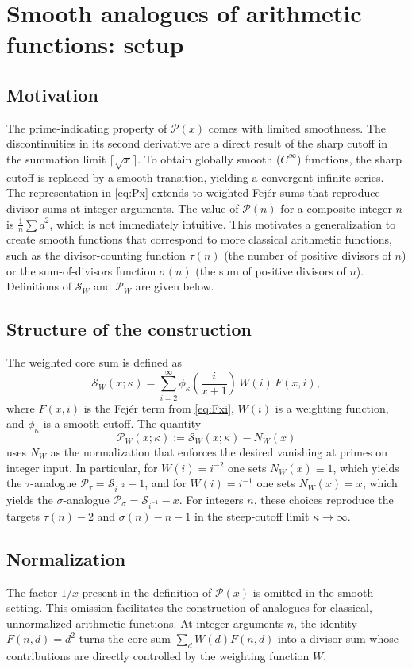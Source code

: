 \section{Smooth analogues of arithmetic functions: setup}

\subsection{Motivation}
The prime-indicating property of $\mathcal{P}(x)$ comes with limited smoothness.
The discontinuities in its second derivative are a direct result of the sharp cutoff in the summation limit $\lceil\sqrt{x}\rceil$.
To obtain globally smooth ($C^\infty$) functions, the sharp cutoff is replaced by a smooth transition, yielding a convergent infinite series.
The representation in \eqref{eq:Px} extends to weighted Fejér sums that reproduce divisor sums at integer arguments.
The value of $\mathcal{P}(n)$ for a composite integer $n$ is $\frac{1}{n}\sum d^2$, which is not immediately intuitive.
This motivates a generalization to create smooth functions that correspond to more classical arithmetic functions, such as the divisor-counting function $\tau(n)$ (the number of positive divisors of $n$) or the sum-of-divisors function $\sigma(n)$ (the sum of positive divisors of $n$).
Definitions of $\mathcal{S}_W$ and $\mathcal{P}_W$ are given below.

\subsection{Structure of the construction}
The weighted core sum is defined as
\[ \mathcal{S}_W(x; \kappa) = \sum_{i=2}^{\infty} \phi_{\kappa}\!\left(\frac{i}{x+1}\right) \, W(i) \, F(x,i), \]
where $F(x,i)$ is the Fejér term from \eqref{eq:Fxi}, $W(i)$ is a weighting function, and $\phi_{\kappa}$ is a smooth cutoff. The quantity
\[ \mathcal{P}_W(x; \kappa) := \mathcal{S}_W(x; \kappa) - N_W(x) \]
uses $N_W$ as the normalization that enforces the desired vanishing at primes on integer input. In particular, for $W(i)=i^{-2}$ one sets $N_W(x)\equiv 1$, which yields the $\tau$-analogue $\mathcal P_\tau=\mathcal S_{i^{-2}}-1$, and for $W(i)=i^{-1}$ one sets $N_W(x)=x$, which yields the $\sigma$-analogue $\mathcal P_\sigma=\mathcal S_{i^{-1}}-x$. For integers $n$, these choices reproduce the targets $\tau(n)-2$ and $\sigma(n)-n-1$ in the steep-cutoff limit $\kappa\to\infty$.

\subsection{Normalization}
The factor $1/x$ present in the definition of $\mathcal{P}(x)$ is omitted in the smooth setting. This omission facilitates the construction of analogues for classical, unnormalized arithmetic functions. At integer arguments $n$, the identity $F(n,d)=d^2$ turns the core sum $\sum_d W(d)F(n,d)$ into a divisor sum whose contributions are directly controlled by the weighting function $W$.

